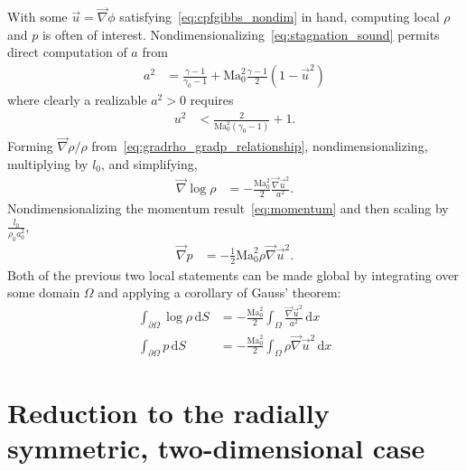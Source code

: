 \documentclass[letterpaper,11pt,nointlimits,reqno]{amsart}
\newcommand{\Mach}[1][]{\mbox{Ma}_{#1}}
\begin{document}
With some $\vec{u}=\vec{\nabla}\phi$ satisfying~\eqref{eq:cpfgibbs_nondim} in
hand, computing local $\rho$ and $p$ is often of interest.
Nondimensionalizing~\eqref{eq:stagnation_sound} permits direct computation of
$a$ from
\begin{align}
  a^2 &= \frac{\gamma-1}{\gamma_0-1}
       + \Mach[0]^2\frac{\gamma-1}{2}\left(1-\vec{u}^2\right)
\label{eq:stagnation_sound_nondim}
\end{align}
where clearly a realizable $a^2>0$ requires
\begin{align}
  u^2 &< \frac{2}{\Mach[0]^2\left(\gamma_0-1\right)} + 1
.
\label{eq:stagnation_sound_realizability_nondim}
\end{align}
Forming $\vec{\nabla}\rho / \rho$ from~\eqref{eq:gradrho_gradp_relationship},
nondimensionalizing, multiplying by $l_0$, and simplifying,
\begin{align}
  \vec{\nabla}\log\rho
  &=
  -\frac{\Mach[0]^2}{2}\frac{\vec{\nabla}\vec{u}^2}{a^2}
.
\end{align}
Nondimensionalizing the momentum result~\eqref{eq:momentum} and then scaling by
$\frac{l_0}{\rho_0 a_0^2}$,
\begin{align}
  \vec{\nabla} p &= - \frac{1}{2}\Mach[0]^2 \rho \vec{\nabla}\vec{u}^2
.
\end{align}
Both of the previous two local statements can be made global by integrating
over some domain $\Omega$ and applying a corollary of Gauss' theorem:
\begin{align}
  \int_{\partial\Omega} \log\rho \, \mathrm{d}S
  &=
  - \frac{\Mach[0]^2}{2}\int_{\Omega}
    \frac{\vec{\nabla}\vec{u}^2}{a^2} \, \mathrm{d}x
\label{eq:logrho_nondim}
\\
  \int_{\partial\Omega} p \, \mathrm{d}S
  &=
  - \frac{\Mach[0]^2}{2}\int_{\Omega} \rho \vec{\nabla}\vec{u}^2 \, \mathrm{d}x
\label{eq:p_nondim}
\end{align}

\section{Reduction to the radially symmetric, two-dimensional case}
\end{document}
